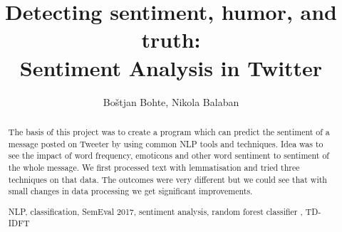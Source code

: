 \documentclass[runningheads,a4paper]{llncs}
\newcommand{\keywords}[1]{\par\addvspace\baselineskip
\noindent\keywordname\enspace\ignorespaces#1}
\begin{document}
\mainmatter  %

\title{Detecting sentiment, humor, and truth:\\Sentiment Analysis in Twitter}


%
%
\author{Bo\v{s}tjan Bohte, Nikola Balaban}%

%


%
%

\maketitle


\begin{abstract}
The basis of this project was to create a program which can predict the sentiment of a message posted on Tweeter by using common NLP tools and techniques. Idea was to see the impact of word frequency, emoticons and other word sentiment to sentiment of the whole message. We first processed text with lemmatisation and tried three techniques on that data. The outcomes were very different but we could see that with small changes in data processing we get significant improvements.
\keywords{NLP, classification, SemEval 2017, sentiment analysis, random forest classifier , TD-IDFT}
\end{abstract}
\end{document}
